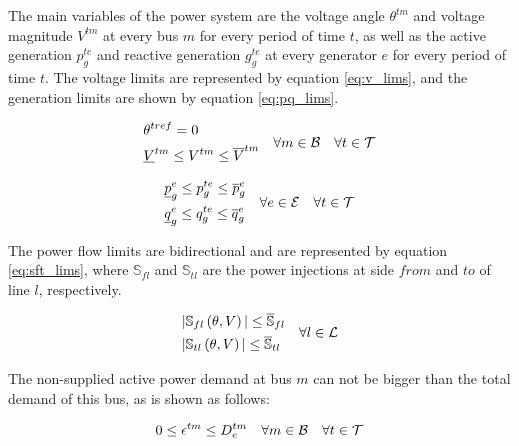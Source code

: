 The main variables of the power system are the voltage angle $\theta^{tm}$ and voltage magnitude $V^{tm}$ at every bus $m$ for every period of time $t$, as well as the active generation $p^{te}_{g}$ and reactive generation $g^{te}_{g}$ at every generator $e$ for every period of time $t$. The voltage  limits are represented by equation \ref{eq:v_lims}, and the generation limits are shown by equation \ref{eq:pq_lims}.

\begin{equation}
\begin{aligned}
&\theta^{tref} = 0\\
&\underline{V}^{tm} \le V^{tm}  \le \overline{V}^{tm}\\
\end{aligned} 
\quad \forall m \in {\cal{B}} \quad \forall t  \in {\cal{T}}  
\label{eq:v_lims}
\end{equation}

\begin{equation}
\begin{aligned}
&\underline{p}_{g}^{e} \le p_{g}^{te}  \le \overline{p}_{g}^{e}\\
&\underline{q}_{g}^{e} \le q_{g}^{te}  \le \overline{q}_{g}^{e}\\
\end{aligned} 
\quad \forall e \in {\cal{E}} \quad \forall t  \in {\cal{T}}  
\label{eq:pq_lims}
\end{equation}

The power flow limits are bidirectional and are represented by equation \ref{eq:sft_lims}, where $\mathbb{S}_{fl}$ and $\mathbb{S}_{tl}$ are the power injections at side $from$ and $to$ of line $l$, respectively.

\begin{equation}
\begin{aligned}
&|\mathbb{S}_{fl}\left(\theta,V\right)| \le \overline{\mathbb{S}}_{fl}\\
&|\mathbb{S}_{tl}\left(\theta,V\right)| \le \overline{\mathbb{S}}_{tl}\\
\end{aligned} 
\quad \forall l \in {\cal{L}}
\label{eq:sft_lims}
\end{equation}

 The non-supplied active power demand at bus $m$ can not be bigger than the total demand of this bus, as is shown as follows:
 
\begin{equation}
0 \le \epsilon^{tm} \le D^{tm}_{e} \quad \forall m \in {\cal{B}} \quad \forall t  \in {\cal{T}}  
\label{nsd_limits}
\end{equation}

